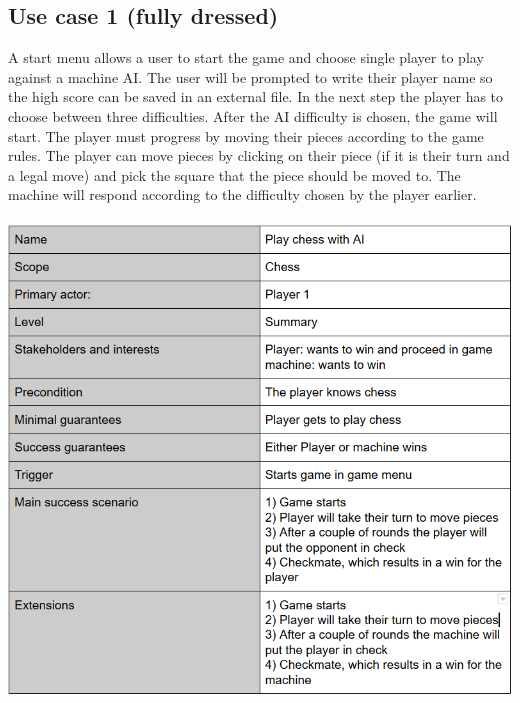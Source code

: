 \documentclass{article}
\begin{document}
        \subsection{Use case 1 (fully dressed)}
        A start menu allows a user to start the game and choose single player to
        play against a machine AI. The user will be prompted to write their player
        name so the high score can be saved in an external file. In the next step
        the player has to choose between three difficulties. After the AI difficulty
        is chosen, the game will start. The player must progress by moving their
        pieces according to the game rules. The player can move pieces by clicking
        on their piece (if it is their turn and a legal move) and pick the square that
        the piece should be moved to. The machine will respond according to the
        difficulty chosen by the player earlier. \\ \\
        \includegraphics[width=\linewidth]{play-ai.png}

        \vspace{30mm}
\end{document}
